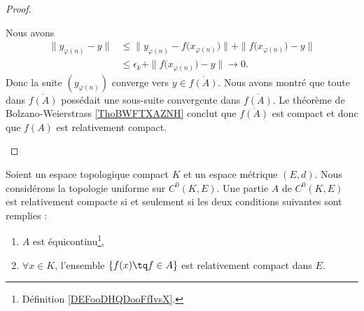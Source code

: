 \begin{proof}
\begin{subproof}
		Nous avons
		\begin{subequations}
			\begin{align}
				\| y_{\varphi(n)}-y \| & \leq \| y_{\varphi(n)}-f\big( x_{\varphi(n)} \big) \|+\| f\big( x_{\varphi(n)} \big)-y \| \\
				                       & \leq \epsilon_k+\| f\big( x_{\varphi(n)} \big)-y \|\to 0.
			\end{align}
		\end{subequations}
		Donc la suite \( (y_{\varphi(n)})\) converge vers \( y\in \overline{ f(A) }\). Nous avons montré que toute dans \( \overline{ f(A) }\) possédait une sous-suite convergente dans \( \overline{ f(A) }\). Le théorème de Bolzano-Weierstrass \ref{ThoBWFTXAZNH} conclut que \( \overline{ f(A) }\) est compact et donc que \( f(A)\) est relativement compact.
	\end{subproof}
\end{proof}

\begin{theorem}        \label{ThoKRbtpah}
	Soient un espace topologique compact \( K\) et un espace métrique \( (E,d)\). Nous considérons la topologie uniforme sur \( C^0(K,E)\). Une partie \( A\) de \( C^0(K,E)\) est relativement compacte si et seulement si les deux conditions suivantes sont remplies :
	\begin{enumerate}
		\item
		      \( A\) est équicontinu\footnote{Définition \ref{DEFooDHQDooFfIvsX}.},
		\item
		      \( \forall x\in K\), l'ensemble \( \{ f(x)\tq f\in A \}\) est relativement compact dans \( E\).
	\end{enumerate}
\end{theorem}

